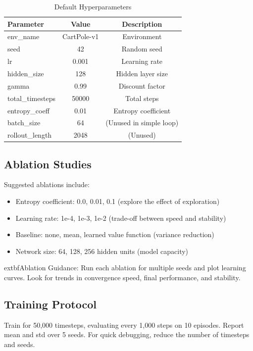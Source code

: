 \documentclass[conference]{IEEEtran}
\begin{document}
\begin{table}[H]
\centering
\caption{Default Hyperparameters}
\label{tab:hp}
\begin{tabular}{@{}lcc@{}}
\toprule
Parameter & Value & Description \\
\midrule
env\_name & CartPole-v1 & Environment \\
seed & 42 & Random seed \\
lr & 0.001 & Learning rate \\
hidden\_size & 128 & Hidden layer size \\
gamma & 0.99 & Discount factor \\
total\_timesteps & 50000 & Total steps \\
entropy\_coeff & 0.01 & Entropy coefficient \\
batch\_size & 64 & (Unused in simple loop) \\
rollout\_length & 2048 & (Unused) \\
\bottomrule
\end{tabular}
\end{table}

\subsection{Ablation Studies}


Suggested ablations include:
\begin{itemize}
\item Entropy coefficient: 0.0, 0.01, 0.1 (explore the effect of exploration)
\item Learning rate: 1e-4, 1e-3, 1e-2 (trade-off between speed and stability)
\item Baseline: none, mean, learned value function (variance reduction)
\item Network size: 64, 128, 256 hidden units (model capacity)
\end{itemize}

	extbf{Ablation Guidance:} Run each ablation for multiple seeds and plot learning curves. Look for trends in convergence speed, final performance, and stability.

\subsection{Training Protocol}


Train for 50,000 timesteps, evaluating every 1,000 steps on 10 episodes. Report mean and std over 5 seeds. For quick debugging, reduce the number of timesteps and seeds.
\end{document}
